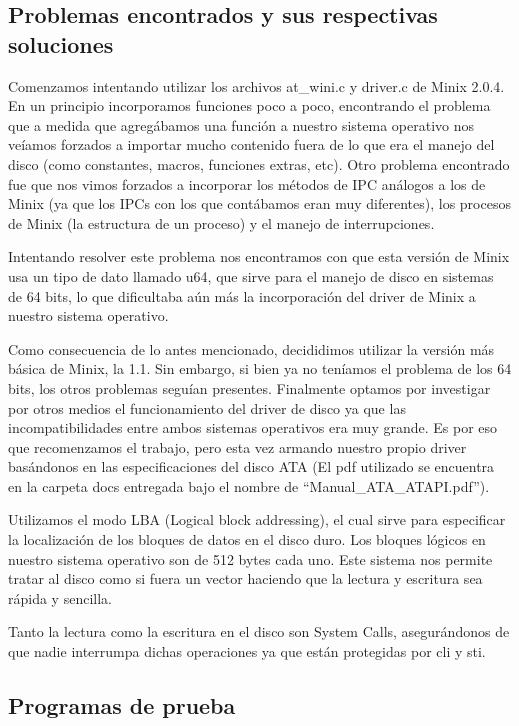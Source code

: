 \documentclass[a4paper,10pt]{article}
\begin{document}
\subsection{Problemas encontrados y sus respectivas soluciones}
\par
Comenzamos intentando utilizar los archivos at\_wini.c y driver.c de Minix 2.0.4. En un 
principio incorporamos funciones poco a poco, encontrando el problema que a medida que 
agregábamos una función a nuestro sistema operativo nos veíamos forzados a importar mucho 
contenido fuera de lo que era el manejo del disco (como constantes, macros, funciones extras, etc).
Otro problema encontrado fue que nos vimos forzados a incorporar los métodos de IPC análogos a
los de Minix (ya que los IPCs con los que contábamos eran muy diferentes), los procesos de Minix 
(la estructura de un proceso) y el manejo de interrupciones.\par
Intentando resolver este problema nos encontramos con que esta versión de Minix usa un tipo de
dato llamado u64, que sirve para el manejo de disco en sistemas de 64 bits, lo que dificultaba 
aún más la incorporación del driver de Minix a nuestro sistema operativo.\par
Como consecuencia de lo antes mencionado, decididimos utilizar la versión más básica de Minix, la 1.1.
Sin embargo, si bien ya no teníamos el problema de los 64 bits, los otros problemas seguían presentes.
Finalmente optamos por investigar por otros medios el funcionamiento del driver de disco ya que las
incompatibilidades entre ambos sistemas operativos era muy grande. Es por eso que recomenzamos el trabajo, 
pero esta vez armando nuestro propio driver basándonos en las especificaciones del disco ATA (El pdf utilizado
se encuentra en la carpeta docs entregada bajo el nombre de ``Manual\_ATA\_ATAPI.pdf'').\par
Utilizamos el modo LBA (Logical block addressing), el cual sirve para especificar la localización de los bloques de datos en el 
disco duro. Los bloques lógicos en nuestro sistema operativo son de 512 bytes cada uno. Este sistema nos permite tratar al disco
como si fuera un vector haciendo que la lectura y escritura sea rápida y sencilla. \par
Tanto la lectura como la escritura en el disco son System Calls, asegurándonos de que nadie interrumpa dichas operaciones ya que 
están protegidas por cli y sti.


\subsection{Programas de prueba}
\end{document}
